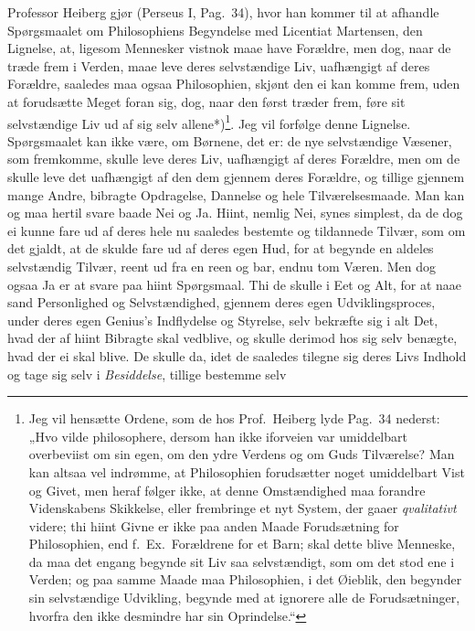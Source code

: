 \documentclass[12pt,a4paper]{book}
\newcommand{\apage}[1]{\marginnote{\footnotesize\textit{[#1]}}}
\begin{document}
Professor Heiberg gjør (Perseus I, Pag.\ 34), hvor han kommer til at
afhandle Spørgsmaalet om Philosophiens Begyndelse med Licentiat
Martensen, den Lignelse, at, ligesom Mennesker vistnok maae have
Forældre, men dog, naar de træde frem i Verden, maae leve deres
selvstændige Liv, uafhængigt af deres Forældre, saaledes maa ogsaa
Philosophien, skjønt den ei kan komme frem, uden at forudsætte Meget
foran sig, dog, naar den \apage{50} først træder frem, føre sit selvstændige Liv
ud af sig selv allene*)\footnote{Jeg vil hensætte Ordene, som de hos
Prof.\ Heiberg lyde Pag.\ 34 nederst: „Hvo vilde philosophere, dersom
han ikke iforveien var umiddelbart overbeviist om sin egen, om den ydre
Verdens og om Guds Tilværelse? Man kan altsaa vel indrømme, at
Philosophien forudsætter noget umiddelbart Vist og Givet, men heraf
følger ikke, at denne Omstændighed maa forandre Videnskabens Skikkelse,
eller frembringe et nyt System, der gaaer \emph{qvalitativt} videre; thi hiint
Givne er ikke paa anden Maade Forudsætning for Philosophien, end f.\
Ex.\ Forældrene for et Barn; skal dette blive Menneske, da maa det
engang begynde sit Liv saa selvstændigt, som om det stod ene i Verden;
og paa samme Maade maa Philosophien, i det Øieblik, den begynder sin
selvstændige Udvikling, begynde med at ignorere alle de Forudsætninger,
hvorfra den ikke desmindre har sin Oprindelse.“}. Jeg vil forfølge
denne Lignelse. Spørgsmaalet kan ikke være, om Børnene, det er: de nye
selvstændige Væsener, som fremkomme, skulle leve deres Liv, uafhængigt
af deres Forældre, men om de skulle leve det uafhængigt af den dem
gjennem deres Forældre, og tillige gjennem mange Andre, bibragte
Opdragelse, Dannelse og hele Tilværelsesmaade. Man kan og maa hertil
svare baade Nei og Ja. Hiint, nemlig Nei, synes simplest, da de dog ei
kunne fare ud af deres hele nu saaledes bestemte og tildannede Tilvær,
som om det gjaldt, at de skulde fare ud af deres egen Hud, for at
begynde en aldeles selvstændig Tilvær, reent ud fra en reen og bar,
endnu tom Væren. Men dog ogsaa Ja er at svare paa hiint Spørgsmaal. Thi
de skulle i Eet og Alt, for at naae sand Personlighed og
Selvstændighed, gjennem deres egen Udviklingsproces, under deres egen
Genius's Indflydelse og Styrelse, selv bekræfte sig i alt Det, hvad der
af hiint Bibragte skal vedblive, og skulle derimod hos sig selv benægte,
hvad der ei skal blive. De skulle da, idet de saaledes tilegne sig
deres Livs Indhold og tage sig selv i \emph{Besiddelse}, tillige bestemme selv
\end{document}
